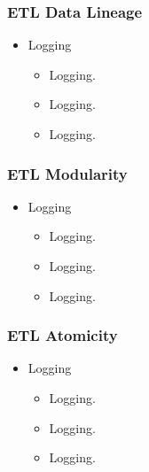 
\begin{frame}
\frametitle{ETL Data Lineage}
\begin{itemize}[<+->]
	\item Logging
	\begin{itemize}[<+->]
		\item  Logging.
		\item  Logging.
		\item  Logging.
		
		
	\end{itemize}
\end{itemize}
\end{frame}


\begin{frame}
\frametitle{ETL Modularity}
\begin{itemize}[<+->]
	\item Logging
	\begin{itemize}[<+->]
		\item  Logging.
		\item  Logging.
		\item  Logging.
		
		
	\end{itemize}
\end{itemize}
\end{frame}


\begin{frame}
\frametitle{ETL Atomicity}
\begin{itemize}[<+->]
	\item Logging
	\begin{itemize}[<+->]
		\item  Logging.
		\item  Logging.
		\item  Logging.
		
		
	\end{itemize}
\end{itemize}
\end{frame}

